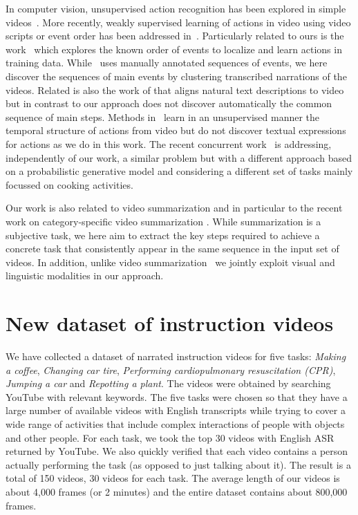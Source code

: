 \documentclass[10pt,twocolumn,letterpaper]{article}
\begin{document}
In computer vision, unsupervised action recognition has been explored in simple videos~\cite{Niebles08}. 
More recently, weakly supervised learning of actions in video using video scripts or event order has been addressed in~\cite{Bojanowski13finding,Bojanowski14weakly,Bojanowski15weakly,Duchenne2009automatic,Laptev08a}. 
Particularly related to ours is the work~\cite{Bojanowski14weakly} which explores the known order of events to localize and learn actions in training data. 
While~\cite{Bojanowski14weakly} uses manually annotated sequences of events, we here discover the sequences of main events by clustering  transcribed narrations of the videos. Related is also the work of
\cite{Bojanowski15weakly} that aligns natural text descriptions to video but in contrast to our approach does not discover automatically the common sequence of main steps. 
Methods in~\cite{Niebles10a,Raptis13} learn in an unsupervised manner the temporal structure of actions from video but do not discover textual expressions for actions as we do in this work.
The recent concurrent work~\cite{Sener15unsupervised} is addressing, independently of our work, a similar problem but with a different approach based on a probabilistic generative model and considering a different set of tasks mainly focussed on cooking activities.
%
%

%

Our work is also related to video summarization and in particular to the recent work on category-specific video summarization \cite{Potapov14category,Sun14ranking}. While summarization is a subjective task, we here aim to extract the key steps required to achieve a concrete task that  consistently appear in the same sequence in the input set of videos. In addition, unlike video summarization~\cite{Potapov14category,Sun14ranking} we jointly exploit visual and linguistic modalities in our approach.

%
%
%

%
%
%
%
%

%


\vspace{3mm}
%
\section{New dataset of instruction videos}
\label{sec:dataset}
%
%
We have collected a dataset of narrated instruction videos for five tasks: \textit{Making a coffee}, \textit{Changing car tire}, \textit{Performing cardiopulmonary resuscitation (CPR)}, \textit{Jumping a car} and \textit{Repotting a plant}. 
The videos were obtained by searching YouTube with relevant keywords. 
The five tasks were chosen so that they have a large number of available videos with English transcripts while trying to cover a wide range of activities that include complex interactions of people with objects and other people.
For each task, we took the top 30 videos with English ASR returned by YouTube.
We also quickly verified that each video contains a person actually performing the task (as opposed to just talking about it).
The result is a total of 150 videos, 30 videos for each task.
%
The average length of our videos is about 4,000 frames (or 2 minutes) and the entire dataset contains about 800,000 frames.
\end{document}
